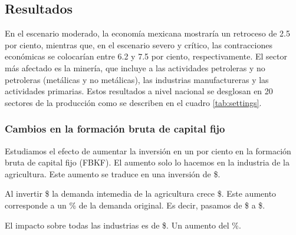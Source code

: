 \subsection*{Resultados}

En el escenario moderado, la economía mexicana mostraría un retroceso de 2.5 por ciento, mientras que, en el escenario severo y crítico, las contracciones económicas se colocarían entre 6.2 y 7.5 por ciento, respectivamente.
El sector más afectado es la minería, que incluye a las actividades petroleras y no petroleras (metálicas y no metálicas), las industrias manufactureras y las actividades primarias.
Estos resultados a nivel nacional se desglosan en 20 sectores de la producción como se describen en el cuadro \ref{tab:settings}.

\begin{table}[htbp]
    \centering
    \caption{Pronóstico de los impactos negativos sobre el PIB por sectores en México (modelo nacional).}
\label{tab:settings}
\end{table}

\subsubsection*{Cambios en la formación bruta de capital fijo}
Estudiamos el efecto de aumentar la inversión en un  por ciento en la formación bruta de capital fijo (FBKF). 
El aumento solo lo hacemos en la industria de la agricultura. 
Este aumento se traduce en una inversión de \$. 

Al invertir \$ la demanda intemedia de la agricultura crece \$. 
Este aumento corresponde a un \% de la demanda original. 
Es decir, pasamos de \$ a \$.

El impacto sobre todas las industrias es de \$.
Un aumento del \%.

